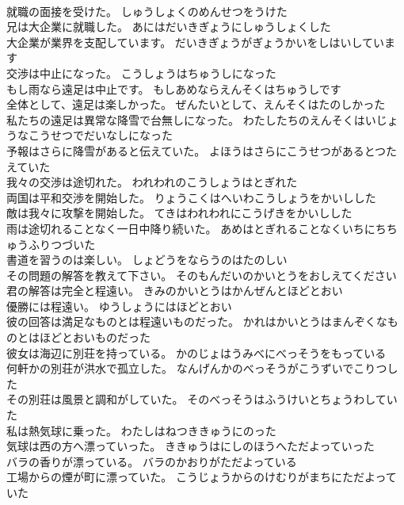 \documentclass[8pt]{extreport}
\begin{document}
\begin{CJK}{UTF8}{min}
\\	就職の面接を受けた。	しゅうしょくのめんせつをうけた 
\\	兄は大企業に就職した。	あにはだいきぎょうにしゅうしょくした 
\\	大企業が業界を支配しています。	だいきぎょうがぎょうかいをしはいしています 
\\	交渉は中止になった。	こうしょうはちゅうしになった 
\\	もし雨なら遠足は中止です。	もしあめならえんそくはちゅうしです 
\\	全体として、遠足は楽しかった。	ぜんたいとして、えんそくはたのしかった 
\\	私たちの遠足は異常な降雪で台無しになった。	わたしたちのえんそくはいじょうなこうせつでだいなしになった 
\\	予報はさらに降雪があると伝えていた。	よほうはさらにこうせつがあるとつたえていた 
\\	我々の交渉は途切れた。	われわれのこうしょうはとぎれた 
\\	両国は平和交渉を開始した。	りょうこくはへいわこうしょうをかいしした 
\\	敵は我々に攻撃を開始した。	てきはわれわれにこうげきをかいしした 
\\	雨は途切れることなく一日中降り続いた。	あめはとぎれることなくいちにちちゅうふりつづいた 
\\	書道を習うのは楽しい。	しょどうをならうのはたのしい 
\\	その問題の解答を教えて下さい。	そのもんだいのかいとうをおしえてください 
\\	君の解答は完全と程遠い。	きみのかいとうはかんぜんとほどとおい 
\\	優勝には程遠い。	ゆうしょうにはほどとおい 
\\	彼の回答は満足なものとは程遠いものだった。	かれはかいとうはまんぞくなものとはほどとおいものだった 
\\	彼女は海辺に別荘を持っている。	かのじょはうみべにべっそうをもっている 
\\	何軒かの別荘が洪水で孤立した。	なんげんかのべっそうがこうずいでこりつした 
\\	その別荘は風景と調和がしていた。	そのべっそうはふうけいとちょうわしていた 
\\	私は熱気球に乗った。	わたしはねつききゅうにのった 
\\	気球は西の方へ漂っていった。	ききゅうはにしのほうへただよっていった 
\\	バラの香りが漂っている。	バラのかおりがただよっている 
\\	工場からの煙が町に漂っていた。	こうじょうからのけむりがまちにただよっていた 

\end{CJK}
\end{document}
